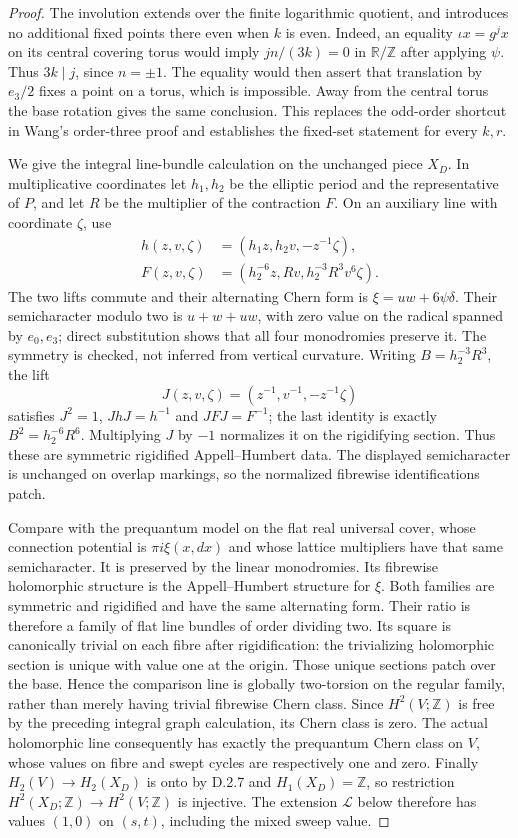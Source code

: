 \begin{proof}
The involution extends over the finite logarithmic quotient,
and introduces no additional fixed points there even when $k$
is even. Indeed, an equality $\iota x=g^j x$ on its central
covering torus would imply $jn/(3k)=0$ in $\mathbb R/\mathbb Z$
after applying $\psi$. Thus $3k\mid j$, since $n=\pm1$.
The equality would then assert that translation by $e_3/2$
fixes a point on a torus, which is impossible. Away from the
central torus the base rotation gives the same conclusion.
This replaces the odd-order shortcut in Wang's order-three
proof and establishes the fixed-set statement for every $k,r$.

We give the integral line-bundle calculation on the unchanged
piece $X_D$. In multiplicative coordinates let $h_1,h_2$ be
the elliptic period and the representative of $P$, and let $R$
be the multiplier of the contraction $F$. On an auxiliary line
with coordinate $\zeta$, use
\[
 \begin{aligned}
 h(z,v,\zeta)&=(h_1z,h_2v,-z^{-1}\zeta),\\
 F(z,v,\zeta)&=(h_2^{-6}z,Rv,h_2^{-3}R^3v^6\zeta).
 \end{aligned}
\]
The two lifts commute and their alternating Chern form is
$\xi=uw+6\psi\delta$. Their semicharacter modulo two is
$u+w+uw$, with zero value on the radical spanned by $e_0,e_3$;
direct substitution shows that all four monodromies preserve it.
The symmetry is checked, not inferred from vertical curvature.
Writing $B=h_2^{-3}R^3$, the lift
\[
 J(z,v,\zeta)=(z^{-1},v^{-1},-z^{-1}\zeta)
\]
satisfies $J^2=1$, $JhJ=h^{-1}$ and $JFJ=F^{-1}$;
the last identity is exactly $B^2=h_2^{-6}R^6$.
Multiplying $J$ by $-1$ normalizes it on the rigidifying section.
Thus these are symmetric rigidified Appell--Humbert data.
The displayed semicharacter is unchanged on overlap markings,
so the normalized fibrewise identifications patch.

Compare with the prequantum model on the flat real universal
cover, whose connection potential is $\pi i\xi(x,dx)$ and
whose lattice multipliers have that same semicharacter.
It is preserved by the linear monodromies. Its fibrewise
holomorphic structure is the Appell--Humbert structure for $\xi$.
Both families are symmetric and rigidified and have the same
alternating form. Their ratio is therefore a family of flat
line bundles of order dividing two. Its square is canonically
trivial on each fibre after rigidification: the trivializing
holomorphic section is unique with value one at the origin.
Those unique sections patch over the base. Hence the comparison
line is globally two-torsion on the regular family, rather than
merely having trivial fibrewise Chern class. Since $H^2(V;\mathbb Z)$
is free by the preceding integral graph calculation, its Chern
class is zero. The actual holomorphic line consequently has
exactly the prequantum Chern class on $V$, whose values on
fibre and swept cycles are respectively one and zero.
Finally $H_2(V)\to H_2(X_D)$ is onto by D.2.7 and
$H_1(X_D)=\mathbb Z$, so restriction
$H^2(X_D;\mathbb Z)\to H^2(V;\mathbb Z)$ is injective.
The extension $\mathcal L$ below therefore has values $(1,0)$
on $(s,t)$, including the mixed sweep value.


\end{proof}
